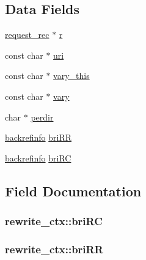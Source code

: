 \subsection*{Data Fields}
\begin{DoxyCompactItemize}
\item 
\hyperlink{structrequest__rec}{request\+\_\+rec} $\ast$ \hyperlink{structrewrite__ctx_a083ee94e1209fa4ad3174fbaa2048844}{r}
\item 
const char $\ast$ \hyperlink{structrewrite__ctx_a57d2ee96d2c5b7b66d5d60a39b3484ca}{uri}
\item 
const char $\ast$ \hyperlink{structrewrite__ctx_a1b56fab34d46af2c6610e5922253dcbc}{vary\+\_\+this}
\item 
const char $\ast$ \hyperlink{structrewrite__ctx_a4c0833e92885cce4265ef1fdbdfec05b}{vary}
\item 
char $\ast$ \hyperlink{structrewrite__ctx_a8c84980ee7236c051691ce566ca3ef57}{perdir}
\item 
\hyperlink{structbackrefinfo}{backrefinfo} \hyperlink{structrewrite__ctx_abd05c97739889faa2ba22310e106a1ce}{bri\+RR}
\item 
\hyperlink{structbackrefinfo}{backrefinfo} \hyperlink{structrewrite__ctx_affff11f4541eb0860d7562dc82e03cef}{bri\+RC}
\end{DoxyCompactItemize}


\subsection{Field Documentation}
\subsubsection[{\texorpdfstring{bri\+RC}{briRC}}]{ rewrite\+\_\+ctx\+::bri\+RC}\hypertarget{structrewrite__ctx_affff11f4541eb0860d7562dc82e03cef}{}\label{structrewrite__ctx_affff11f4541eb0860d7562dc82e03cef}
\subsubsection[{\texorpdfstring{bri\+RR}{briRR}}]{ rewrite\+\_\+ctx\+::bri\+RR}\hypertarget{structrewrite__ctx_abd05c97739889faa2ba22310e106a1ce}{}\label{structrewrite__ctx_abd05c97739889faa2ba22310e106a1ce}
